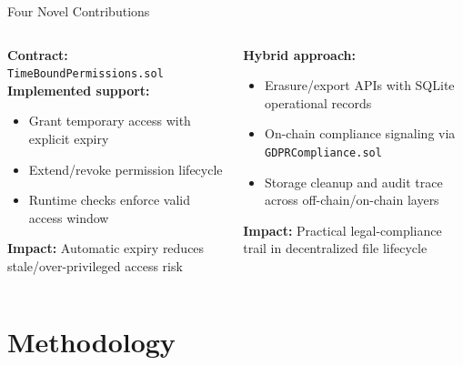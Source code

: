 \documentclass[aspectratio=169]{beamer}
\begin{document}
\begin{frame}{Four Novel Contributions}
\begin{columns}[T]
\begin{tcolorbox}[orangebox, title=\textbf{N3: Time-Bound Permissions},
  height=5.8cm, valign=top]
\scriptsize
\textbf{Contract:} \texttt{TimeBoundPermissions.sol}\\[5pt]
\textbf{Implemented support:}
\begin{itemize}
  \item Grant temporary access with explicit expiry
  \item Extend/revoke permission lifecycle
  \item Runtime checks enforce valid access window
\end{itemize}
\textbf{Impact:} Automatic expiry reduces stale/over-privileged access risk
\end{tcolorbox}
\begin{tcolorbox}[redbox, title=\textbf{N4: GDPR Compliance Module},
  height=5.8cm, valign=top]
\scriptsize
\textbf{Hybrid approach:}
\begin{itemize}
  \item Erasure/export APIs with SQLite operational records
  \item On-chain compliance signaling via \texttt{GDPRCompliance.sol}
  \item Storage cleanup and audit trace across off-chain/on-chain layers
\end{itemize}
\textbf{Impact:} Practical legal-compliance trail in decentralized file lifecycle
\end{tcolorbox}
\end{columns}
\end{frame}

\section{Methodology}
\end{document}
